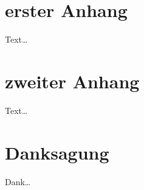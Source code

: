 \documentclass[bachelor,       %
               twoside,        %
               BCOR10mm,       %
               ngerman,english  %
               ]{GAUBM}
\begin{document}
\appendix
\chapter{erster Anhang}
Text\dots
\chapter{zweiter Anhang}
Text\dots

\cleardoublepage
 

\chapter*{Danksagung}
Dank\dots

\begin{otherlanguage}{ngerman}
\Declaration
\end{otherlanguage}
\end{document}
